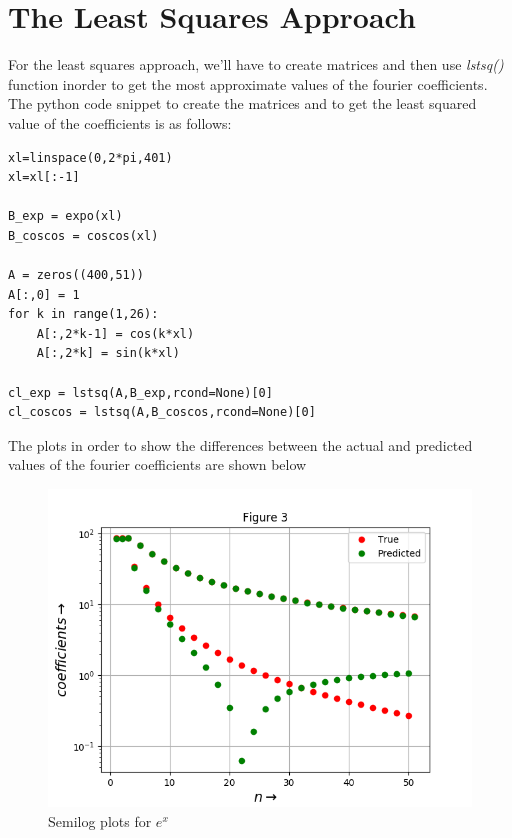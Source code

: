 \documentclass[11pt, a4paper]{article}
\begin{document}
\section{The Least Squares Approach}
For the least squares approach, we'll have to create matrices and then use \textit{lstsq()} function inorder to get the most approximate values of the fourier coefficients.\\
The python code snippet to create the matrices and to get the least squared value of the coefficients is as follows:
\begin{verbatim}	
xl=linspace(0,2*pi,401)
xl=xl[:-1] 

B_exp = expo(xl)
B_coscos = coscos(xl) 

A = zeros((400,51))
A[:,0] = 1
for k in range(1,26):
    A[:,2*k-1] = cos(k*xl)
    A[:,2*k] = sin(k*xl)

cl_exp = lstsq(A,B_exp,rcond=None)[0]
cl_coscos = lstsq(A,B_coscos,rcond=None)[0]
\end{verbatim}
The plots in order to show the differences between the actual and predicted values of the fourier coefficients are shown below

	\begin{figure}[!tbh]
   	\centering
   	\includegraphics[scale=0.6]{Figure_7.png}   
   	\caption{Semilog plots for $e^{x}$}
   	\label{fig:sample}
   \end{figure} 
   
\end{document}
